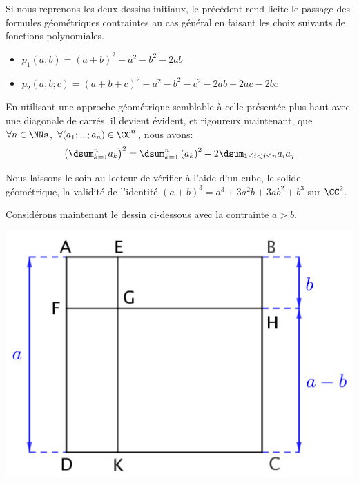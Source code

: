 

\begin{example}
    Si nous reprenons les deux dessins initiaux, le  précédent rend licite le passage des formules géométriques contraintes au cas général en faisant les choix suivants de fonctions polynomiales.
    \begin{itemize}[label=\small\textbullet]
    	\item $p_1(a ; b) = (a + b)^2 - a^2 - b^2 - 2 ab$
    
    	\item $p_2(a ; b ; c) = (a + b + c)^2 - a^2 - b^2 - c^2 - 2 ab - 2 ac - 2 bc$
    \end{itemize}
\end{example}


\begin{example}
	En utilisant une approche géométrique semblable à celle présentée plus haut avec une diagonale de carrés, il devient évident, et rigoureux maintenant, que $\forall n \in \NNs$, $\forall (a_1 ; ... ; a_n) \in \CC^n$, nous avons:
    \[
    	\big( \dsum_{k=1}^{n}a_k \big)^2
    	=
    	\dsum_{k=1}^{n} \left( a_k \right)^2
    	+
    	2 \dsum_{1 \leq i < j \leq n} a_i a_j
    \]
\end{example}




\begin{example}
	Nous laissons le soin au lecteur de vérifier à l'aide d'un cube, le solide géométrique, la validité de l'identité $(a + b)^3 = a^3 + 3 a^2 b + 3 a b^2 + b^3$ sur $\CC^2$.
\end{example}




\newpage
Considérons maintenant le dessin ci-dessous avec la contrainte $a > b$.
%
\begin{center}
	\includegraphics[scale = .7]{(a-b)^2.png}
\end{center}

